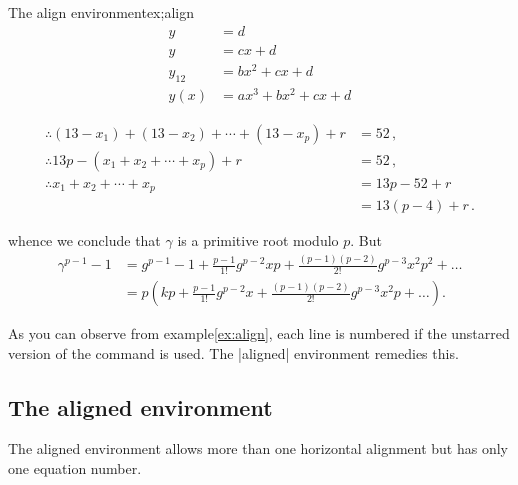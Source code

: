 \begin{texexample}{The align environment}{ex;align}
\begin{align}
         y & =d\label{eq:IntoSection}\\
         y & =cx+d\\
 y_{12} & =bx^{2}+cx+d\\
     y(x) & =ax^{3}+bx^{2}+cx+d
 \end{align}

\begin{align*}
\therefore (13 - x_1) + (13 - x_2) + \dotsb + (13 - x_p) + r &= 52\,,\\
\therefore 13p - (x_1 + x_2 + \dotsb + x_p) + r              &= 52\,,\\
\therefore x_1 + x_2 + \dotsb + x_p                          &= 13p - 52 + r\\
                                                          &= 13 (p - 4) + r\,.
\end{align*}

whence we conclude that $\gamma$ is a primitive root modulo $p$. But
\begin{align*}
\gamma^{p-1}-1 &=
     g^{p-1} - 1 + \frac{p-1}{1!}g^{p-2}xp +
        \frac{(p-1)(p-2)}{2!}g^{p-3}x^2p^2 + \ldots \\
  &= p\left(kp + \frac{p-1}{1!}g^{p-2}x +
        \frac{(p-1)(p-2)}{2!}g^{p-3}x^2p + \ldots\right).
\end{align*}
\end{texexample}

As you can observe from example\ref{ex:align}, each line is numbered if the unstarred version of the command is used. The |aligned| environment remedies this.
 


\subsection{The aligned environment}

The aligned environment allows more than one horizontal alignment but has only one equation number.

\newcommand{\dotsbsmall}{\ldot\!\ldot\!\ldot}
\newcommand{\ldot}{\mathbin{.}}			%
\newcommand{\nobf}[1]{\no \textbf{#1}}		%


